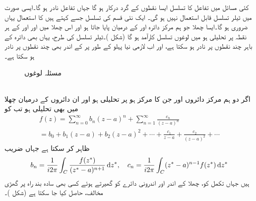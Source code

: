کئی مسائل میں تفاعل  کا تسلسل ایسا نقطوں کے گرد درکار ہو گا جہاں تفاعل نادر ہو گا۔ایسی صورت میں ٹیلر تسلسل قابل استعمال نہیں ہو گی۔ ایک نئی قسم کی تسلسل جسے  کہتے ہیں کا استعمال یہاں ضروری ہو گا۔ایسا چھلا جو ہم مرکز دائرہ  اور  کے درمیان پایا جاتا ہو اور  اس چھلا میں اور  اور  کے ہر نقطہ پر تحلیلی ہو میں لوغوں تسلسل کارآمد ہو گا (شکل )۔ٹیلر تسلسل کی طرح، یہاں بھی  دائرہ  کے باہر چند نقطوں پر نادر ہو سکتا ہے، اور اب لازمی نیا پہلو کے طور پر  کے اندر بھی  چند نقطوں پر نادر ہو سکتا ہے۔
\begin{figure}
\centering
{}
\caption{مسئلہ لوغوں}
\label{شکل_ٹیلر_مسئلہ_لوغوں}
\end{figure}

\quad {}\\
اگر دو ہم مرکز دائروں  اور  جن کا مرکز  ہو پر  تحلیلی ہو اور ان دائروں کے درمیان چھلا میں بھی  تحلیلی ہو تب  کو 
\begin{multline}\label{مساوات_ٹیلر_لوغوں_تسلسل_الف}
f(z)=\sum\limits_{n=0}^{\infty} b_n(z-a)^n+\sum\limits_{n=1}^{\infty}\frac{c_n}{(z-a)^n}\\
=b_0+b_1(z-a)+b_2(z-a)^2+\cdots+\frac{c_1}{z-a}+\frac{c_2}{(z-a)^2}+\cdots
\end{multline}
ظاہر کر سکتا ہے جہاں  ضریب 
\begin{align}\label{مساوات_ٹیلر_لوغوں_تسلسل_ب}
b_n=\frac{1}{i2\pi}\int_C\frac{f(z^*)}{(z^*-a)^{n+1}}\dif z^*,\quad c_n=\frac{1}{i2\pi}\int_C (z^*-a)^{n-1} f(z^*)\dif z^*
\end{align}
ہیں جہاں تکمل کو، چھلا کے اندر  اور اندرونی دائرے کو گھیرتے ہوئے  کسی بھی سادہ بند راہ  پر گھڑی مخالف، حاصل کیا جا سکتا ہے (شکل )۔

